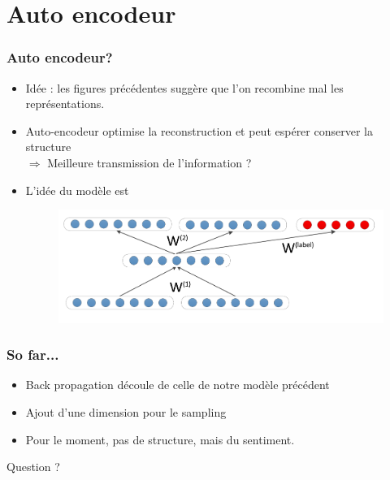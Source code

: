 \documentclass{beamer}
\begin{document}
\section{Auto encodeur}
\begin{frame}
\frametitle{Auto encodeur?}
\begin{itemize}
\item Idée : les figures précédentes suggère que l'on recombine mal les représentations.
\item Auto-encodeur optimise la reconstruction et peut espérer conserver la structure \\
$\Rightarrow$ Meilleure transmission de l'information ?
\item L'idée du modèle est
\begin{figure}[htp]
\centering
\includegraphics[scale=0.2]{fig/model_RAE.png}
\label{}
\end{figure}
\end{itemize}
\end{frame}


\begin{frame}
\frametitle{So far...}
\begin{itemize}\setlength{\itemsep}{5mm}
\item Back propagation découle de celle de notre modèle précédent
\item Ajout d'une dimension pour le sampling
\item Pour le moment, pas de structure, mais du sentiment.
\end{itemize}
\end{frame}



\begin{frame}
\Huge{\centerline{Question ?}}
\end{frame}

\end{document}
